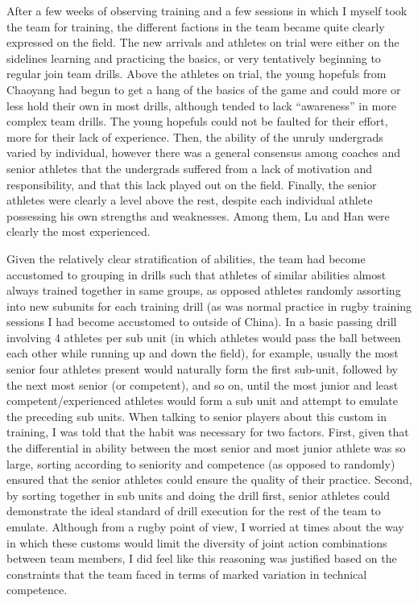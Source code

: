   After a few weeks of observing training and a few sessions in which I myself took the team for training, the different factions in the team became quite clearly expressed on the field.  The new arrivals and athletes on trial were either on the sidelines learning and practicing the basics, or very tentatively beginning to regular join team drills. Above the athletes on trial, the young hopefuls from Chaoyang had begun to get a hang of the basics of the game and could more or less hold their own in most drills, although tended to lack ``awareness'' in more complex team drills. The young hopefuls could not be faulted for their effort, more for their lack of experience. Then, the ability of the unruly undergrads varied by individual, however there was a general consensus among coaches and senior athletes that the undergrads suffered from a lack of motivation and responsibility, and that this lack played out on the field.  Finally, the senior athletes were clearly a level above the rest, despite each individual athlete possessing his own strengths and weaknesses.  Among them, Lu and Han were clearly the most experienced.

  Given the relatively clear stratification of abilities, the team had become accustomed to grouping in drills such that athletes of similar abilities almost always trained together in same groups, as opposed athletes randomly assorting into new subunits for each training drill (as was normal practice in rugby training sessions I had become accustomed to outside of China). In a basic passing drill involving 4 athletes per sub unit (in which athletes would pass the ball between each other while running up and down the field), for example, usually the most senior four athletes present would naturally form the first sub-unit, followed by the next most senior (or competent), and so on, until the most junior and least competent/experienced athletes would form a sub unit and attempt to emulate the preceding sub units.  When talking to senior players about this custom in training, I was told that the habit was necessary for two factors. First, given that the differential in ability between the most senior and most junior athlete was so large, sorting according to seniority and competence (as opposed to randomly) ensured that the senior athletes could ensure the quality of their practice.  Second, by sorting together in sub units and doing the drill first, senior athletes could demonstrate the ideal standard of drill execution for the rest of the team to emulate.  Although from a rugby point of view, I worried at times about the way in which these customs would limit the diversity of joint action combinations between team members, I did feel like this reasoning was justified based on the constraints that the team faced in terms of marked variation in technical competence.

